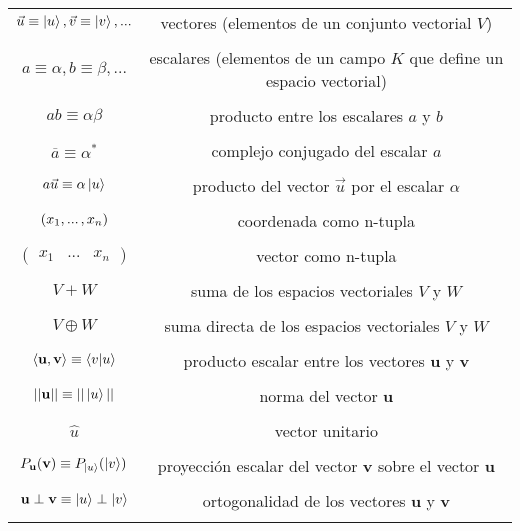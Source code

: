 \documentclass[12pt,dvipsnames]{article}
\numberwithin{equation}{section}
\begin{document}
\begin{tcolorbox}
\centering
\begin{tabular}{cc}
    \\
    $\vec{u}\equiv\ket{u}, \vec{v}\equiv\ket{v}, ...$ & vectores (elementos de un conjunto vectorial $V$) \\ \\
    $a\equiv\alpha,b\equiv\beta, ...$ & escalares (elementos de un campo $K$ que define un espacio vectorial) \\ \\
    $ab\equiv \alpha\beta$ & producto entre los escalares $a$ y $b$ \\ \\
    $\overline{a} \equiv \alpha^\ast$ & complejo conjugado del escalar $a$ \\ \\
    $a\vec{u}\equiv\alpha\ket{u}$ & producto del vector $\vec{u}$ por el escalar $\alpha$ \\ \\
    $(x_1,...\hspace{0.5mm},x_n) $ & coordenada como n-tupla \\ \\
    $\begin{pmatrix}x_1&...&x_n\end{pmatrix}$ & vector como n-tupla \\ \\
    $V + W$ & suma de los espacios vectoriales $V$ y $W$ \\ \\
    $V \oplus W$ & suma directa de los espacios vectoriales $V$ y $W$ \\ \\
    $\langle\mathbf{u},\mathbf{v}\rangle \equiv \braket{v|u}$ & producto escalar entre los vectores $\mathbf{u}$ y $\mathbf{v}$ \\ \\
    $||\mathbf{u}||\equiv || \ket{u} ||$ & norma del vector $\mathbf{u}$ \\ \\
    $\hat{u}$ & vector unitario \\ \\
    $P_{\mathbf{u}}(\mathbf{v}) \equiv P_{\ket{u}}(\ket{v})$ & proyección escalar del vector $\mathbf{v}$ sobre el vector $\mathbf{u}$ \\ \\
    $\mathbf{u}\perp\mathbf{v} \equiv \ket{u}\perp\ket{v}$ & ortogonalidad de los vectores $\mathbf{u}$ y $\mathbf{v}$ \\ \\

\end{tabular}
\end{tcolorbox}
\end{document}
